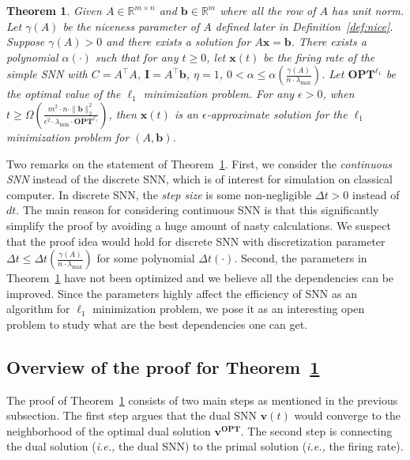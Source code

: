 \documentclass[11pt]{article}
\newtheorem{theorem}{Theorem}
\theoremstyle{remark}
\theoremstyle{definition}
\newcommand{\bx}{\mathbf{x}}
\newcommand{\bb}{\mathbf{b}}
\newcommand{\bv}{\mathbf{v}}
\newcommand{\bI}{\mathbf{I}}
\newcommand{\ATA}{A^\top A}
\newcommand{\ATb}{A^\top\bb}
\newcommand{\Dt}{\Delta t}
\newcommand{\OPT}{\mathbf{OPT}}
\newcommand{\R}{{\mathbb R}} %
\begin{document}
\begin{theorem}\label{thm:l1}
	Given $A\in\R^{m\times n}$ and $\bb\in\R^m$ where all the row of $A$ has unit norm. Let $\gamma(A)$ be the niceness parameter of $A$ defined later in Definition~\ref{def:nice}. Suppose $\gamma(A)>0$ and there exists a solution for $A\bx=\bb$. There exists a polynomial $\alpha(\cdot)$ such that for any $t\geq0$, let $\bx(t)$ be the firing rate of the simple SNN with $C = \ATA$, $\bI = \ATb$, $\eta=1$, $0<\alpha\leq \alpha(\frac{\gamma(A)}{n\cdot\lambda_{\max}})$. Let $\OPT^{\ell_1}$ be the optimal value of the $\ell_1$ minimization problem. For any $\epsilon>0$, when $t\geq\Omega(\frac{m^2\cdot n\cdot\|\bb\|_2^2}{\epsilon^2\cdot\lambda_{\min}\cdot\OPT^{\ell_1}})$, then $\bx(t)$ is an $\epsilon$-approximate solution for the $\ell_1$ minimization problem for $(A,\bb)$.
\end{theorem}

Two remarks on the statement of Theorem~\ref{thm:l1}. First, we consider the \textit{continuous SNN} instead of the discrete SNN, which is of interest for simulation on classical computer. In discrete SNN, the \textit{step size} is some non-negligible $\Dt>0$ instead of $dt$. The main reason for considering continuous SNN is that this significantly simplify the proof by avoiding a huge amount of nasty calculations. We suspect that the proof idea would hold for discrete SNN with discretization parameter $\Dt\leq\Dt(\frac{\gamma(A)}{n\cdot\lambda_{\max}})$ for some polynomial $\Dt(\cdot)$.
Second, the parameters in Theorem~\ref{thm:l1} have not been optimized and we believe all the dependencies can be improved. Since the parameters highly affect the efficiency of SNN as an algorithm for $\ell_1$ minimization problem, we pose it as an interesting open problem to study what are the best dependencies one can get.

\subsection{Overview of the proof for Theorem~\ref{thm:l1}}

The proof of Theorem~\ref{thm:l1} consists of two main steps as mentioned in the previous subsection. The first step argues that the dual SNN $\bv(t)$ would converge to the neighborhood of the optimal dual solution $\bv^\OPT$. The second step is connecting the dual solution (\textit{i.e.,} the dual SNN) to the primal solution (\textit{i.e.,} the firing rate).
\end{document}
